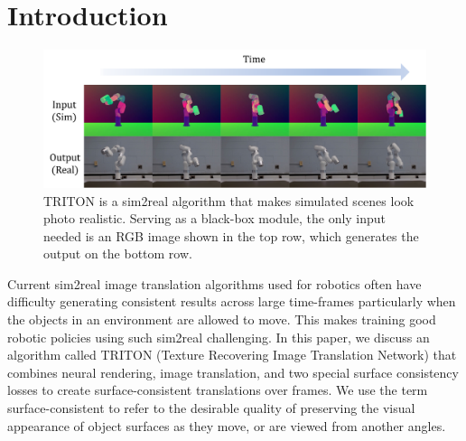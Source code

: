 \documentclass{article}
\begin{document}
\section{Introduction}

    

\begin{figure}[thbp]
	\vspace{-10pt}
	\begin{center}
		\includegraphics[width=\textwidth]{../images/figure0.pdf}
	\end{center}
	\vspace{-5pt}
	\caption{
		TRITON is a sim2real algorithm that makes simulated scenes look photo realistic. Serving as a black-box module, the only input needed is an RGB image shown in the top row, which generates the output on the bottom row.
	}
	\label{fig:figure0}
	\vspace{-5pt}
\end{figure}


Current sim2real image translation algorithms used for robotics \cite{retina_gan,rl_cyclegan} often have difficulty generating consistent results across large time-frames particularly when the objects in an environment are allowed to move. This makes training good robotic policies using such sim2real challenging.
In this paper, we discuss an algorithm called TRITON (Texture Recovering Image Translation Network) that combines neural rendering, image translation, and two special surface consistency losses to create surface-consistent translations over frames.
We use the term surface-consistent to refer to the desirable quality of preserving the visual appearance of object surfaces as they move, or are viewed from another angles. 
\end{document}
